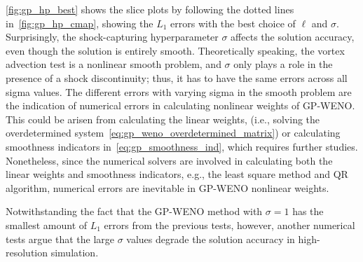 \cref{fig:gp_hp_best} shows the slice plots by following the dotted lines
in~\cref{fig:gp_hp_cmap}, showing the \( L_{1} \) errors
with the best choice of \( \ell \) and \( \sigma \).
Surprisingly, the shock-capturing hyperparameter \( \sigma \) affects the solution accuracy,
even though the solution is entirely smooth.
Theoretically speaking, the vortex advection test is a nonlinear smooth problem,
and \( \sigma \) only plays a role in the presence of a shock discontinuity;
thus, it has to have the same errors across all sigma values.
The different errors with varying sigma in the smooth problem are the indication
of numerical errors in calculating nonlinear weights of GP-WENO\@.
This could be arisen from calculating the linear weights,
(i.e., solving the overdetermined system~\cref{eq:gp_weno_overdetermined_matrix})
or calculating smoothness indicators in~\cref{eq:gp_smoothness_ind},
which requires further studies.
Nonetheless, since the numerical solvers are involved in calculating
both the linear weights and smoothness indicators,
e.g., the least square method and QR algorithm,
numerical errors are inevitable in GP-WENO nonlinear weights.

Notwithstanding the fact that the GP-WENO method with \( \sigma = 1 \)
has the smallest amount of \( L_{1} \) errors
from the previous tests, however,
another numerical tests argue that the large \( \sigma \) values
degrade the solution accuracy in high-resolution simulation.

